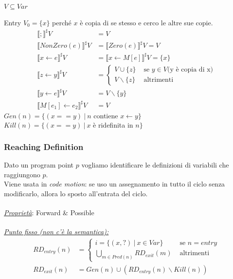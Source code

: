 \documentclass{article}
\begin{document}
                $V\subseteq Var$

                Entry $V_0=\{x\}$ perché $x$ è copia di se stesso e cerco le altre sue copie.
                \begin{align*}
                    \llbracket ; \rrbracket^\sharp V &= V\\
                    \llbracket NonZero(e) \rrbracket^\sharp V &= \llbracket Zero(e) \rrbracket^\sharp V = V\\
                    \llbracket x\leftarrow e \rrbracket^\sharp V &= \llbracket x\leftarrow M[e]\rrbracket^\sharp V = \{x\}\\
                    \llbracket z\leftarrow y \rrbracket^\sharp V &=
                    \begin{cases}
                        V \cup \{z\} &\text{ se } y\in V \text{(y è copia di x)} \\
                        V\backslash \{z\} &\text{ altrimenti}
                    \end{cases}\\
                    \llbracket y\leftarrow e \rrbracket^\sharp V &= V\backslash \{y\}\\
                    \llbracket M[e_1]\leftarrow e_2 \rrbracket^\sharp V &= V
                \end{align*}
                $Gen(n) = \{(x == y) ~|~ n$ contiene $x\leftarrow y \}$\\
                $Kill(n) = \{(x == y) ~|~ x$ è ridefinita in $n \}$

            \subsubsection{Reaching Definition}
                Dato un program point $p$ vogliamo identificare le definizioni di variabili che raggiungono $p$.\\
                Viene usata in \textit{code motion}: se uso un assegnamento in tutto il ciclo senza modificarlo, allora lo sposto all'entrata del ciclo.\\
                \\
                \textit{\underline{Proprietà}}: Forward \& Possible\\
                \\
                \underline{\textit{Punto fisso (non c'è la semantica):}}
                \begin{align*}
                    RD_{entry}(n) &=
                    \begin{cases}
                        i=\{(x, ?) ~|~ x\in Var \} &\text{ se $n= entry$} \\
                        \bigcup_{m\in Pred(n)} RD_{exit}(m) &\text{ altrimenti}
                    \end{cases}\\
                    RD_{exit}(n) &= Gen(n) \cup (RD_{entry}(n)\backslash Kill(n))
                \end{align*}
\end{document}
